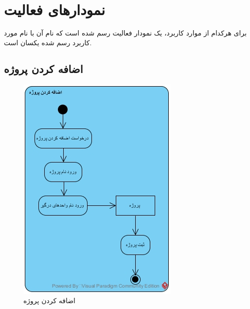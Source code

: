 \chapter{نمودارهای فعالیت}
برای هرکدام از موارد کاربرد، یک نمودار فعالیت رسم شده است که نام آن با نام مورد کاربرد رسم شده یکسان است.
\section{اضافه کردن پروژه}
\begin{figure}[H]
	\centering
	\includegraphics[scale=0.8]{img/activity/addproject}
	\caption{اضافه کردن پروژه}
\end{figure}

